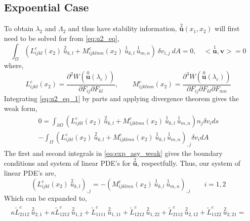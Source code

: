 \documentclass[11pt]{report}
\begin{document}
\begin{appendices}
\section{Expoential Case}
To obtain $\lambda_2$ and $\Lambda_2$ and thus have stability information, $\overset{2}{\mathbf{u}}(x_1, x_2)$ will first need to be solved for from \eqref{eq:u2_eq},
\begin{equation} \label{eq:u2_eq_1}
\int_\Omega ( L^c_{ijkl}(x_2) \: \overset{2}{u}_{k,l} + M^c_{ijklmn}(x_2) \: \overset{1}{u}_{k,l} \: \overset{1}{u}_{m,n} ) \: \delta v_{i,j} \: dA = 0,  \quad <\overset{1}{\mathbf{u}}, \mathbf{v} > = 0
\end{equation} 
where,
\begin{equation*}
L^c_{ijkl}(x_2) = \frac{\partial^2 W(\overset{0}{\mathbf{u}}(\lambda_c))}{\partial F_{ij} \partial F_{kl}}, \qquad M^c_{ijklmn}(x_2) = \frac{\partial^3 W(\overset{0}{\mathbf{u}}(\lambda_c))}{\partial F_{ij} \partial F_{kl} \partial F_{mn}}
\end{equation*}
Integrating \eqref{eq:u2_eq_1} by parts and applying divergence theorem gives the weak form,
\begin{equation} \label{eq:exp_asy_weak}
\begin{split}
0 = \int_{\partial \Omega} \left( L^c_{ijkl}(x_2) \: \overset{2}{u}_{k,l} + M^c_{ijklmn}(x_2) \: \overset{1}{u}_{k,l} \: \overset{1}{u}_{m,n} \right) n_j \delta v_i ds \\ - \int_\Omega \left( L^c_{ijkl}(x_2) \: \overset{2}{u}_{k,l} + M^c_{ijklmn}(x_2) \: \overset{1}{u}_{k,l} \: \overset{1}{u}_{m,n} \right)_{,j} \delta v_i dA
\end{split}
\end{equation}
The first and second integrals in \eqref{eq:exp_asy_weak} gives the boundary conditions and system of linear PDE's for $\overset{2}{\mathbf{u}}$, respectfully. Thus, our system of linear PDE's are,
\begin{equation}
\left( L^c_{ijkl}(x_2) \: \overset{2}{u}_{k,l} \right)_{,j} = -\left( M^c_{ijklmn}(x_2) \: \overset{1}{u}_{k,l} \: \overset{1}{u}_{m,n} \right)_{,j} \qquad i = 1,2
\end{equation} 
Which can be expanded to,
\begin{align}
\begin{split}
\kappa \tilde{L}^{c}_{2112} \: \overset{2}{u}_{2,1} + \kappa \tilde{L}^{c}_{1212} \: \overset{2}{u}_{1,2} + \tilde{L}^{c}_{1111} \: \overset{2}{u}_{1,11} + \tilde{L}^{c}_{1212} \: \overset{2}{u}_{1,22}+ \tilde{L}^{c}_{2112} \: \overset{2}{u}_{2,12}  + \tilde{L}^{c}_{1122} \: \overset{2}{u}_{2,21} =  \\

\end{split}
\end{align}
\end{appendices}
\end{document}
